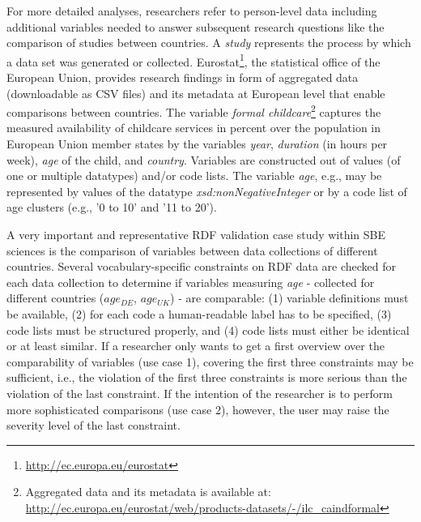 \documentclass[conference]{IEEEtran}
\begin{document}
For more detailed analyses, researchers refer to person-level data including additional variables needed to answer subsequent research questions
like the comparison of studies between countries.
A \emph{study} represents the process by which a data set was generated or collected.
Eurostat\footnote{\url{http://ec.europa.eu/eurostat}}, the statistical office of the European Union, provides research findings in form of aggregated data (downloadable as CSV files) and its metadata at European level that enable comparisons between countries.
The variable \emph{formal childcare}\footnote{Aggregated data and its metadata is available at: \url{http://ec.europa.eu/eurostat/web/products-datasets/-/ilc_caindformal}} %
captures the measured availability of childcare services in percent over the population in European Union member states by 
the variables \emph{year}, \emph{duration} (in hours per week), \emph{age} of the child, and \emph{country}.
Variables are constructed out of values (of one or multiple datatypes) and/or code lists.
The variable \emph{age}, e.g., may be represented by values of the datatype \emph{xsd:nonNegativeInteger} or by a code list of age clusters (e.g., '0 to 10' and '11 to 20'). 

A very important and representative RDF validation case study within SBE sciences is the comparison of variables between data collections of different countries.
Several vocabulary-specific constraints on RDF data are checked for each data collection
to determine if variables measuring \emph{age} 
- collected for different countries (\emph{$age_{DE}$}, \emph{$age_{UK}$}) - 
are comparable:
(1) variable definitions must be available, 
(2) for each code a human-readable label has to be specified,
(3) code lists must be structured properly, and
(4) code lists must either be identical or at least similar.
If a researcher only wants to get a first overview over the comparability of variables (use case 1), 
covering the first three constraints may be sufficient,
i.e., the violation of the first three constraints is more serious than the violation of the last constraint.
If the intention of the researcher is to perform more sophisticated comparisons (use case 2), however, the user may raise the severity level of the last constraint.
 
\end{document}
